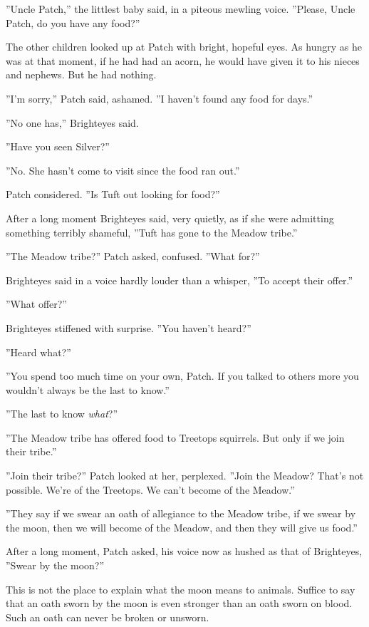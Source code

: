\documentclass[12pt]{book}
\begin{document}
''Uncle Patch,'' the littlest baby said, in a piteous mewling voice. ''Please, Uncle Patch, do you have any food?''

The other children looked up at Patch with bright, hopeful eyes. As hungry as he was at that moment, if he had had an acorn, he would have given it to his nieces and nephews. But he had nothing.

''I'm sorry,'' Patch said, ashamed. ''I haven't found any food for days.''

''No one has,'' Brighteyes said.

''Have you seen Silver?''

''No. She hasn't come to visit since the food ran out.''

Patch considered. ''Is Tuft out looking for food?''

After a long moment Brighteyes said, very quietly, as if she were admitting something terribly shameful, ''Tuft has gone to the Meadow tribe.''

''The Meadow tribe?'' Patch asked, confused. ''What for?''

Brighteyes said in a voice hardly louder than a whisper, ''To accept their offer.''

''What offer?''

Brighteyes stiffened with surprise. ''You haven't heard?''

''Heard what?''

''You spend too much time on your own, Patch. If you talked to others more you wouldn't always be the last to know.''

''The last to know {\it what}?''

''The Meadow tribe has offered food to Treetops squirrels. But only if we join their tribe.''

''Join their tribe?'' Patch looked at her, perplexed. ''Join the Meadow? That's not possible. We're of the Treetops. We can't become of the Meadow.''

''They say if we swear an oath of allegiance to the Meadow tribe, if we swear by the moon, then we will become of the Meadow, and then they will give us food.''

After a long moment, Patch asked, his voice now as hushed as that of Brighteyes, ''Swear by the moon?''

This is not the place to explain what the moon means to animals. Suffice to say that an oath sworn by the moon is even stronger than an oath sworn on blood. Such an oath can never be broken or unsworn.
\end{document}
